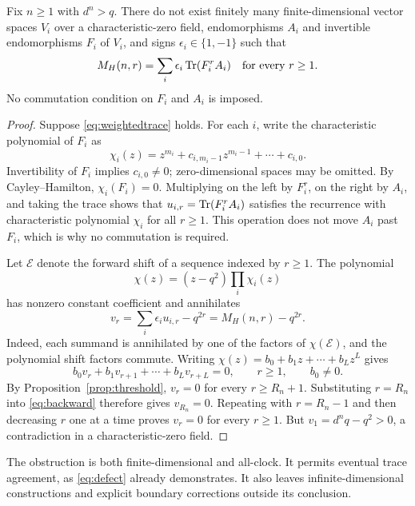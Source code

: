 \begin{proposition}
\label{prop:traceobstruction}
Fix $n\geq1$ with $d^n>q$. There do not exist finitely many
finite-dimensional vector spaces $V_i$ over a characteristic-zero field,
endomorphisms $A_i$ and invertible endomorphisms $F_i$ of $V_i$, and
signs $\epsilon_i\in\{1,-1\}$ such that
\begin{equation}\label{eq:weightedtrace}
 M_H(n,r)=\sum_i\epsilon_i\operatorname{Tr}(F_i^r A_i)
 \quad\text{for every }r\geq1.
\end{equation}
No commutation condition on $F_i$ and $A_i$ is imposed.
\end{proposition}

\begin{proof}
Suppose \eqref{eq:weightedtrace} holds. For each $i$, write the
characteristic polynomial of $F_i$ as
\[
 \chi_i(z)=z^{m_i}+c_{i,m_i-1}z^{m_i-1}+\cdots+c_{i,0}.
\]
Invertibility of $F_i$ implies $c_{i,0}\ne0$; zero-dimensional spaces
may be omitted. By Cayley--Hamilton, $\chi_i(F_i)=0$. Multiplying
on the left by $F_i^r$, on the right by $A_i$, and taking the trace
shows that $u_{i,r}=\operatorname{Tr}(F_i^rA_i)$ satisfies the recurrence with
characteristic polynomial $\chi_i$ for all $r\geq1$.
This operation does not move $A_i$ past $F_i$, which is why no
commutation is required.

Let $\mathcal E$ denote the forward shift of a sequence indexed by
$r\geq1$. The polynomial
\[
 \chi(z)=(z-q^2)\prod_i\chi_i(z)
\]
has nonzero constant coefficient and annihilates
\[
 v_r=\sum_i\epsilon_i u_{i,r}-q^{2r}=M_H(n,r)-q^{2r}.
\]
Indeed, each summand is annihilated by one of the factors of
$\chi(\mathcal E)$, and the polynomial shift factors commute.
Writing $\chi(z)=b_0+b_1z+\cdots+b_Lz^L$ gives
\begin{equation}\label{eq:backward}
 b_0v_r+b_1v_{r+1}+\cdots+b_Lv_{r+L}=0,
 \qquad r\geq1,\qquad b_0\ne0.
\end{equation}
By Proposition~\ref{prop:threshold}, $v_r=0$ for every
$r\geq R_n+1$. Substituting $r=R_n$ into \eqref{eq:backward}
therefore gives $v_{R_n}=0$. Repeating with $r=R_n-1$ and then
decreasing $r$ one at a time proves $v_r=0$ for every $r\geq1$.
But $v_1=d^nq-q^2>0$, a contradiction in a characteristic-zero field.
\end{proof}

The obstruction is both finite-dimensional and all-clock. It permits
eventual trace agreement, as \eqref{eq:defect} already demonstrates.
It also leaves infinite-dimensional constructions and explicit boundary
corrections outside its conclusion.
